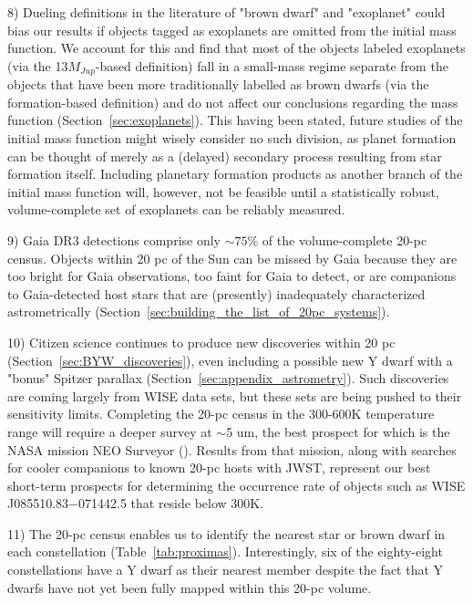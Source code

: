 \documentclass[twocolumn,tighten,twocolappendix]{aastex631}
\begin{document}
8) Dueling definitions in the literature of "brown dwarf" and "exoplanet" could bias our results if objects tagged as exoplanets are omitted from the initial mass function. We account for this and find that most of the objects labeled exoplanets (via the 13$M_{Jup}$-based definition) fall in a small-mass regime separate from the objects that have been more traditionally labelled as brown dwarfs (via the formation-based definition) and do not affect our conclusions regarding the mass function (Section~\ref{sec:exoplanets}). This having been stated, future studies of the initial mass function might wisely consider no such division, as planet formation can be thought of merely as a (delayed) secondary process resulting from star formation itself. Including planetary formation products as another branch of the initial mass function will, however, not be feasible until a statistically robust, volume-complete set of exoplanets can be reliably measured.

9) Gaia DR3 detections comprise only $\sim75\%$ of the volume-complete 20-pc census. Objects within 20 pc of the Sun can be missed by Gaia because they are too bright for Gaia observations, too faint for Gaia to detect, or are companions to Gaia-detected host stars that are (presently) inadequately characterized astrometrically (Section~\ref{sec:building_the_list_of_20pc_systems}).

10) Citizen science continues to produce new discoveries within 20 pc (Section~\ref{sec:BYW_discoveries}), even including a possible new Y dwarf with a "bonus" Spitzer parallax (Section~\ref{sec:appendix_astrometry}). Such discoveries are coming largely from WISE data sets, but these sets are being pushed to their sensitivity limits. Completing the 20-pc census in the 300-600K temperature range will require a deeper survey at $\sim$5 um, the best prospect for which is the NASA mission NEO Surveyor (\citealt{kirkpatrick2019b, mainzer2023}). Results from that mission, along with searches for cooler companions to known 20-pc hosts with JWST, represent our best short-term prospects for determining the occurrence rate of objects such as WISE J085510.83$-$071442.5 that reside below 300K.

11) The 20-pc census enables us to identify the nearest star or brown dwarf in each constellation (Table~\ref{tab:proximas}). Interestingly, six of the eighty-eight constellations have a Y dwarf as their nearest member despite the fact that Y dwarfs have not yet been fully mapped within this 20-pc volume.
\end{document}
